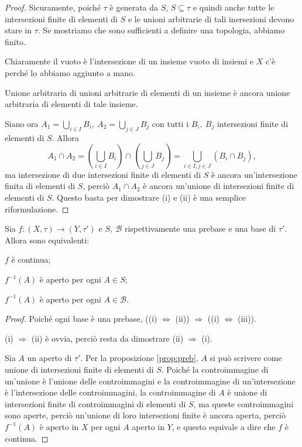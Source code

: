 \documentclass{article}
\begin{document}
\begin{proof}
	Sicuramente, poiché $\tau$ è generata da $S$, $S \subseteq \tau$ e quindi
	anche tutte le intersezioni finite di elementi di $S$ e le unioni arbitrarie
	di tali inersezioni devono stare in $\tau$. Se mostriamo che sono
	sufficienti a definire una topologia, abbiamo finito.

    Chiaramente il vuoto è l'intersezione di un insieme vuoto di insiemi e $X$
    c'è perché lo abbiamo aggiunto a mano.

    Unione arbitraria di unioni arbitrarie di elementi di un insieme è ancora
    unione arbitraria di elementi di tale insieme.

    Siano ora $\displaystyle A_1= \bigcup_{i \in I} B_i,\ A_2=\bigcup_{j \in J} B_j$ con tutti
    i $B_i,\ B_j$ intersezioni finite di elementi di $S$. Allora
    $$A_1 \cap A_2 =
    \left( \bigcup_{i \in I} B_i \right) \cap \left(\bigcup_{j \in J} B_j
    \right)= \bigcup_{i \in I, j \in J} (B_i \cap B_j),$$
     ma  intersezione di due intersezioni finite di elementi di $S$ è ancora
     un'intersezione finita di elementi di $S$, perciò $A_1 \cap A_2$ è ancora
     un'unione di intersezioni finite di elementi di $S$. Questo basta per
     dimostrare (i) e (ii) è una semplice riformulazione.
\end{proof}

\begin{prop}
	Sia $f: (X, \tau) \rightarrow (Y, \tau')$ e $S,\ \mathcal{B}$
	rispettivamente una prebase e una base di $\tau'$. Allora sono equivalenti:
	\begin{nlist}
		\item $f$ è continua;
		\item $f^{-1}(A)$ è aperto per ogni $A \in S$;
		\item $f^{-1}(A)$ è aperto per ogni $A \in \mathcal{B}$.
	\end{nlist}
\end{prop}

\begin{proof}
	Poiché ogni base è una prebase, ((i) $\Leftrightarrow$ (ii)) $\Rightarrow$
	((i) $\Leftrightarrow$ (iii)).

	(i) $\Rightarrow$ (ii) è ovvia, perciò resta da dimostrare (ii)
	$\Rightarrow$ (i).

	Sia $A$ un aperto di $\tau'$. Per la proposizione \ref{prop:preb}, $A$ si
	può scrivere come unione di intersezioni finite di elementi di $S$. Poiché
	la controimmagine di un'unione è l'unione delle controimmagini e la
	controimmagine di un'intersezione è l'intersezione delle controimmagini, la
	controimmagine di $A$ è unione di intersezioni finite di controimmagini di
	elementi di $S$, ma queste controimmagini sono aperte, perciò un'unione di
	loro intersezioni finite è ancora aperta, perciò $f^{-1}(A)$ è aperto in $X$
	per ogni $A$ aperto in $Y$, e questo equivale a dire che $f$ è continua.
\end{proof}
\end{document}
